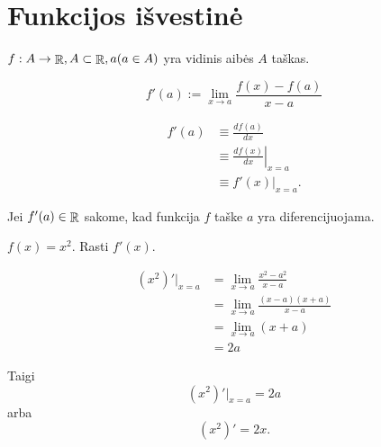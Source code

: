 \chapter{Funkcijos išvestinė}

\begin{note}
  $f : A \to \mathop{\mathbb{R}}, A \subset \mathop{\mathbb{R}}, a(a \in A)$ yra vidinis aibės 
  $A$ taškas.
\end{note}

\begin{defn}
  \begin{equation*}
    f'(a) := \lim_{x \to a} \frac{f(x) - f(a)}{x - a}
  \end{equation*}
\end{defn}

\begin{notation}
  \begin{align*}
    f'(a) 
    &\equiv \frac{d f(a)}{dx} \\
    &\equiv \left. \frac{d f(x)}{dx} \right|_{x = a} \\
    &\equiv \left. f'(x) \right|_{x = a}.
  \end{align*}
\end{notation}

Jei $f'(a) \in \mathop{\mathbb{R}}$ sakome, kad funkcija $f$ taške $a$ yra 
diferencijuojama.

\begin{exmp}
  $f(x) = x^{2}$. Rasti $f'(x)$.

  \begin{align*}
    (x^{2})'|_{x=a} 
    &= \lim_{x \to a} \frac{x^{2} - a^{2}}{x - a} \\
    &= \lim_{x \to a} \frac{(x - a)(x + a)}{x - a} \\
    &= \lim_{x \to a} (x + a)\\
    &= 2a
  \end{align*}

  Taigi 
  \begin{equation*}
    (x^{2})'|_{x = a} = 2a
  \end{equation*}
  arba
  \begin{equation*}
    (x^{2})' = 2x.
  \end{equation*}
\end{exmp}

